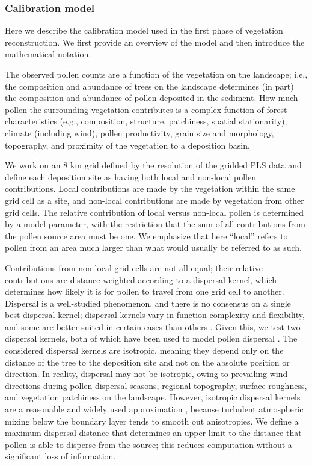 \documentclass[12pt]{article}
\begin{document}

\subsubsection{Calibration model}
\label{sec:cal}

Here we describe the calibration model used in the first phase of
vegetation reconstruction. We first provide an overview of the model
and then introduce the mathematical notation.

The observed pollen counts are a function of the vegetation on the
landscape; i.e., the composition and abundance of trees on the
landscape determines (in part) the composition and abundance of pollen
deposited in the sediment. How much pollen the surrounding vegetation
contributes is a complex function of forest characteristics (e.g.,
composition, structure, patchiness, spatial stationarity), climate
(including wind), pollen productivity, grain size and morphology,
topography, and proximity of the vegetation to a deposition basin.

We work on an 8 km grid defined by the resolution of the gridded PLS
data and define each deposition site as having both local and
non-local pollen contributions. Local contributions are made by the
vegetation within the same grid cell as a site, and non-local
contributions are made by vegetation from other grid cells. The
relative contribution of local versus non-local pollen is determined
by a model parameter, with the restriction that the sum of all
contributions from the pollen source area must be one. We emphasize
that here ``local'' refers to pollen from an area much larger than
what would usually be referred to as such.

Contributions from non-local grid cells are not all equal; their
relative contributions are distance-weighted according to a dispersal
kernel, which determines how likely it is for pollen to travel from
one grid cell to another. Dispersal is a well-studied phenomenon, and
there is no consensus on a single best dispersal kernel; dispersal
kernels vary in function complexity and flexibility, and some are
better suited in certain cases than others
\citep{clobert2012dispersal}. Given this, we test two dispersal
kernels, both of which have been used to model pollen dispersal
\citep{clobert2012dispersal}. The considered dispersal kernels are
isotropic, meaning they depend only on the distance of the tree to the
deposition site and not on the absolute position or direction. In
reality, dispersal may not be isotropic, owing to prevailing wind
directions during pollen-dispersal seasons, regional topography,
surface roughness, and vegetation patchiness on the
landscape. However, isotropic dispersal kernels are a reasonable and
widely used approximation \citep{sugita2007theory1,
  sugita2007theory2}, because turbulent atmospheric mixing below the
boundary layer tends to smooth out anisotropies. We define a maximum
dispersal distance that determines an upper limit to the distance that
pollen is able to disperse from the source; this reduces computation
without a significant loss of information.
\end{document}
